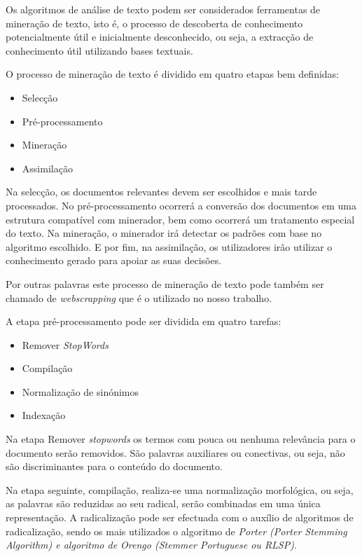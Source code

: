 Os algoritmos de análise de texto podem ser considerados ferramentas de mineração de texto, isto é, o processo de descoberta de conhecimento potencialmente útil e inicialmente desconhecido, ou seja, a extracção de conhecimento útil utilizando bases textuais.

O processo de mineração de texto é dividido em quatro etapas bem definidas:
\begin{itemize}
  \setlength\itemsep{0.05em}
  \item Selecção
  \item Pré-processamento
  \item Mineração
  \item Assimilação
\end{itemize}

Na selecção, os documentos relevantes devem ser escolhidos e mais tarde processados.
No pré-processamento ocorrerá a conversão dos documentos em uma estrutura compatível com minerador, bem como ocorrerá um tratamento especial do texto.
Na mineração, o minerador irá detectar os padrões com base no algoritmo escolhido.
E por fim, na assimilação, os utilizadores irão utilizar o conhecimento gerado para apoiar as suas decisões. 

Por outras palavras este processo de mineração de texto pode também ser chamado de \textit{webscrapping} que é o utilizado no nosso trabalho.

A etapa pré-processamento pode ser dividida em quatro tarefas:
\begin{itemize}
  \setlength\itemsep{0.05em}
  \item Remover \textit{StopWords}
  \item Compilação
  \item Normalização de sinónimos
  \item Indexação
\end{itemize}

Na etapa Remover \textit{stopwords} os termos com pouca ou nenhuma relevância para o documento serão removidos.
São palavras auxiliares ou conectivas, ou seja, não são discriminantes para o conteúdo do documento.

Na etapa seguinte, compilação, realiza-se uma normalização morfológica, ou seja, as palavras são reduzidas ao seu radical, serão combinadas em uma única representação. A radicalização pode ser efectuada com o auxílio de algoritmos de radicalização, sendo os mais utilizados o algoritmo de \textit{Porter (Porter Stemming Algorithm) e algoritmo de Orengo (Stemmer Portuguese ou RLSP)}.

